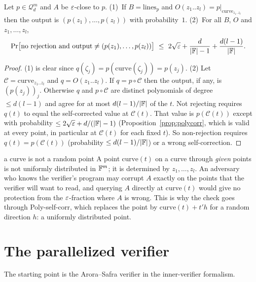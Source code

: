 \begin{lemma}\label{lem:curvecheck}
Let $p\in\mathcal Q^m_d$ and $A$ be $\varepsilon$-close to $p$.  (1)~If $B=\mathrm{lines}_p$ and $O(z_1..z_l)=p|_{\mathrm{curve}_{z_1..z_l}}$ then the output is $(p(z_1),\dots,p(z_l))$ with probability~$1$.
(2)~For all $B$, $O$ and $z_1,\dots,z_l$,
\[
  \Pr\bigl[\text{no rejection and output}\ne(p(z_1),\dots,p(z_l))\bigr]\ \le\ 2\sqrt{\varepsilon}+\frac d{|\mathbb{F}|-1}+\frac{d(l-1)}{|\mathbb{F}|}.
\]
\end{lemma}
\begin{proof}
(1) is clear since $q(\zeta_j)=p(\mathrm{curve}(\zeta_j))=p(z_j)$.  (2) Let $\mathcal C=\mathrm{curve}_{z_1..z_l}$ and $q=O(z_1..z_l)$.  If $q=p\circ\mathcal C$ then the output, if any, is $(p(z_j))_j$.  Otherwise $q$ and $p\circ\mathcal C$ are distinct polynomials of degree $\le d(l-1)$ and agree for at most $d(l-1)/|\mathbb{F}|$ of the $t$.
Not rejecting requires $q(t)$ to equal the self-corrected value at $\mathcal C(t)$.  That value is $p(\mathcal C(t))$ except with probability $\le2\sqrt{\varepsilon}+d/(|\mathbb{F}|-1)$ (Proposition~\ref{prop:polycorr}, which is valid at every point, in particular at $\mathcal C(t)$ for each fixed $t$).
So non-rejection requires $q(t)=p(\mathcal C(t))$ (probability $\le d(l-1)/|\mathbb{F}|$) or a wrong self-correction.
\end{proof}

\begin{pitfall}{a curve is not a random point}
A point $\mathrm{curve}(t)$ on a curve through \emph{given} points is not uniformly distributed in $\mathbb{F}^m$; it is determined by $z_1,\dots,z_l$.  An adversary who knows the verifier's program may corrupt $A$ exactly on the points that the verifier
will want to read, and querying $A$ directly at $\mathrm{curve}(t)$ would give no protection from the $\varepsilon$-fraction where $A$ is wrong.  This is why the check goes through Poly-self-corr, which replaces the point by $\mathrm{curve}(t)+t'h$ for a random direction $h$: a uniformly distributed point.
\end{pitfall}


\section{The parallelized verifier}
\label{sec:par}

The starting point is the Arora--Safra verifier in the inner-verifier formalism.

